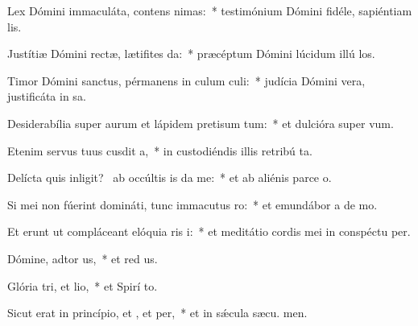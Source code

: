 \item Lex Dómini immaculáta, contens nimas:~* testimónium Dómini fidéle, sapiéntiam  lis.
\item Justítiæ Dómini rectæ, lætifites da:~* præcéptum Dómini lúcidum illú los.
\item Timor Dómini sanctus, pérmanens in culum culi:~* judícia Dómini vera, justificáta in sa.
\item Desiderabília super aurum et lápidem pretisum tum:~* et dulcióra super   vum.
\item Etenim servus tuus cusdit a,~* in custodiéndis illis retribú ta.
\item Delícta quis inligit?~\pscross{} ab occúltis is da me:~* et ab aliénis parce  o.
\item Si mei non fúerint domináti, tunc immacutus ro:~* et emundábor a de mo.
\item Et erunt ut compláceant elóquia ris i:~* et meditátio cordis mei in conspéctu  per.
\item Dómine, adtor us,~* et red us.
\item Glória tri, et lio,~* et Spirí to.
\item Sicut erat in princípio, et , et per,~* et in sǽcula sæcu. men.
